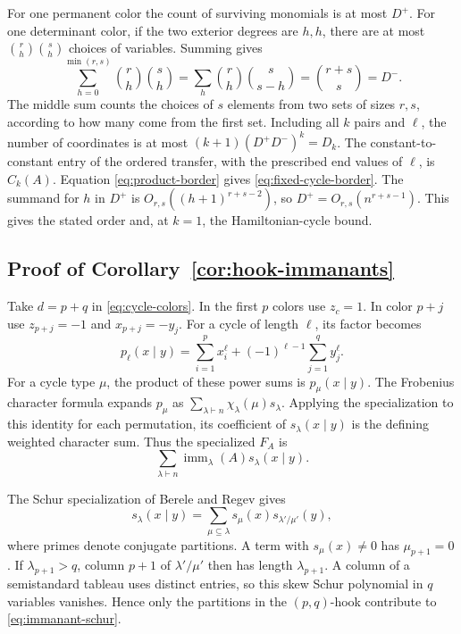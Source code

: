 \documentclass[11pt,reqno]{amsart}
\theoremstyle{remark}
\numberwithin{equation}{section}
\newcommand{\imm}{\operatorname{imm}}
\begin{document}
For one permanent color the count of surviving monomials is at most
\(D^+\). For one determinant color, if the two exterior degrees are
\(h,h\), there are at most \(\binom rh\binom sh\) choices of variables.
Summing gives
\[
 \sum_{h=0}^{\min(r,s)}\binom rh\binom sh
 =\sum_h\binom rh\binom{s}{s-h}=\binom{r+s}{s}=D^- .
\]
The middle sum counts the choices of \(s\) elements from two sets of
sizes \(r,s\), according to how many come from the first set. Including
all \(k\) pairs and \(\ell\), the number of coordinates is at most
\((k+1)(D^+D^-)^k=D_k\). The constant-to-constant entry of the ordered
transfer, with the prescribed end values of \(\ell\), is \(C_k(A)\).
Equation \eqref{eq:product-border} gives \eqref{eq:fixed-cycle-border}.
The summand for \(h\) in \(D^+\) is \(O_{r,s}((h+1)^{r+s-2})\), so
\(D^+=O_{r,s}(n^{r+s-1})\). This gives the stated order and, at \(k=1\),
the Hamiltonian-cycle bound.

\subsection{Proof of Corollary~\ref{cor:hook-immanants}}

Take \(d=p+q\) in \eqref{eq:cycle-colors}. In the first \(p\) colors use
\(z_c=1\). In color \(p+j\) use \(z_{p+j}=-1\) and \(x_{p+j}=-y_j\). For
a cycle of length \(\ell\), its factor becomes
\[
 p_\ell(x\mid y)=\sum_{i=1}^p x_i^\ell+
                    (-1)^{\ell-1}\sum_{j=1}^q y_j^\ell.
\]
For a cycle type \(\mu\), the product of these power sums is
\(p_\mu(x\mid y)\). The Frobenius character formula expands \(p_\mu\) as
\(\sum_{\lambda\vdash n} \chi_\lambda(\mu)s_\lambda\). Applying the
specialization to this identity for each permutation, its coefficient of
\(s_\lambda(x\mid y)\) is the defining weighted character sum. Thus the
specialized \(F_A\) is
\begin{equation}\label{eq:immanant-schur}
 \sum_{\lambda\vdash n}\imm_\lambda(A)s_\lambda(x\mid y).
\end{equation}

The Schur specialization of Berele and Regev \cite{BereleRegev} gives
\[
 s_\lambda(x\mid y)=\sum_{\mu\subseteq\lambda}
                 s_\mu(x)s_{\lambda'/\mu'}(y),
\]
where primes denote conjugate partitions. A term with \(s_\mu(x)\ne0\)
has \(\mu_{p+1}=0\). If \(\lambda_{p+1}>q\), column \(p+1\) of
\(\lambda'/\mu'\) then has length \(\lambda_{p+1}\). A column of a
semistandard tableau uses distinct entries, so this skew Schur polynomial
in \(q\) variables vanishes. Hence only the partitions in the
\((p,q)\)-hook contribute to \eqref{eq:immanant-schur}.
\end{document}
